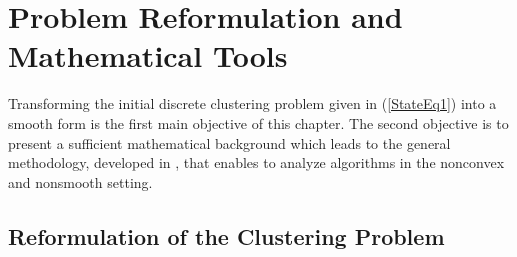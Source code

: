  \chapter{Problem Reformulation and Mathematical Tools} \label{Chapter2}

\noindent \noindent \hrulefill

Transforming the initial discrete clustering problem given in (\ref{StateEq1}) into a smooth form is the first main objective of this chapter. The second objective is to present a sufficient mathematical background which leads to the general methodology, developed in \cite{BST2014}, that enables to analyze algorithms in the nonconvex and nonsmooth setting. 

\noindent \noindent \hrulefill

\section{Reformulation of the Clustering Problem} \label{State_Clustering_Reformulation}

